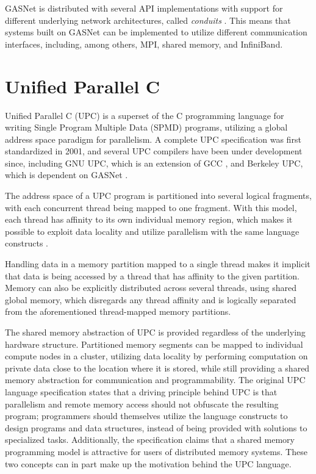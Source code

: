 \documentclass{uit-report}
\begin{document}
GASNet is distributed with several API implementations with support for different underlying network architectures, called \emph{conduits} \cite{gasnetreadme}. This means that systems built on GASNet can be implemented to utilize different communication interfaces, including, among others, MPI, shared memory, and InfiniBand.

\section{Unified Parallel C}
Unified Parallel C (UPC) is a superset of the C programming language for writing Single Program Multiple Data (SPMD) programs, utilizing a global address space paradigm for parallelism. A complete UPC specification was first standardized in 2001, and several UPC compilers have been under development since, including GNU UPC, which is an extension of GCC \cite{web_gnu_upc}, and Berkeley UPC, which is dependent on GASNet \cite{web_berkeley_upc}.

The address space of a UPC program is partitioned into several logical fragments, with each concurrent thread being mapped to one fragment. With this model, each thread has affinity to its own individual memory region, which makes it possible to exploit data locality and utilize parallelism with the same language constructs \cite{evaluation_of_upc}.

Handling data in a memory partition mapped to a single thread makes it implicit that data is being accessed by a thread that has affinity to the given partition. Memory can also be explicitly distributed across several threads, using shared global memory, which disregards any thread affinity and is logically separated from the aforementioned thread-mapped memory partitions.

The shared memory abstraction of UPC is provided regardless of the underlying hardware structure. Partitioned memory segments can be mapped to individual compute nodes in a cluster, utilizing data locality by performing computation on private data close to the location where it is stored, while still providing a shared memory abstraction for communication and programmability. The original UPC language specification \cite{upc_language_specification} states that a driving principle behind UPC is that parallelism and remote memory access should not obfuscate the resulting program; programmers should themselves utilize the language constructs to design programs and data structures, instead of being provided with solutions to specialized tasks. Additionally, the specification claims that a shared memory programming model is attractive for users of distributed memory systems. These two concepts can in part make up the motivation behind the UPC language.
\end{document}
